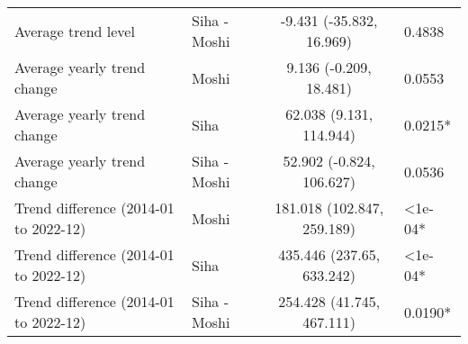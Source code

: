 \begin{longtable}{l|lcl}
Average trend level & Siha - Moshi & -9.431 (-35.832, 16.969) & 0.4838 \\ 
Average yearly trend change & Moshi & 9.136 (-0.209, 18.481) & 0.0553 \\ 
Average yearly trend change & Siha & 62.038 (9.131, 114.944) & 0.0215* \\ 
Average yearly trend change & Siha - Moshi & 52.902 (-0.824, 106.627) & 0.0536 \\ 
Trend difference (2014-01 to 2022-12) & Moshi & 181.018 (102.847, 259.189) & <1e-04* \\ 
Trend difference (2014-01 to 2022-12) & Siha & 435.446 (237.65, 633.242) & <1e-04* \\ 
Trend difference (2014-01 to 2022-12) & Siha - Moshi & 254.428 (41.745, 467.111) & 0.0190* \\ 
\bottomrule
\end{longtable}
\endgroup

